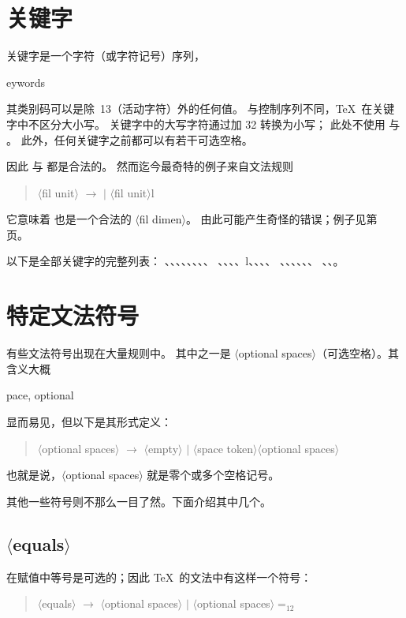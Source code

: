 \documentclass[a4paper]{rapport3}
\def\gr#1{$\langle$#1$\rangle$}\def\key#1{{\tt#1}}
\newenvironment{disp}{\begin{quotation}}{\end{quotation}}
\def\term#1\par{\index{#1}}
\begin{document}
\section{关键字}
\label{keywords}

关键字是一个字符（或字符记号）序列，
\term keywords\par
其类别码可以是除~13（活动字符）外的任何值。
与控制序列不同，\TeX\ 在关键字中不区分大小写。
关键字中的大写字符通过加 32 转换为小写；
此处不使用  与 。
此外，任何关键字之前都可以有若干可选空格。

因此  与  都是合法的。
然而迄今最奇特的例子来自文法规则
\begin{disp}\gr{fil unit} $\longrightarrow$  $|$ \gr{fil unit}\n l
\end{disp}
它意味着 \hbox{} 也是一个合法的 \gr{fil dimen}。
由此可能产生奇怪的错误；例子见第~\pageref{fil:l:l} 页。

以下是全部关键字的完整列表：
、、、、、、、、
、、、、\n l、、、、
、、、、、、
、、。

\section{特定文法符号}

有些文法符号出现在大量规则中。
其中之一是 \gr{optional spaces}（可选空格）。其含义大概\
\term space, optional\par
显而易见，但以下是其形式定义：
\begin{disp}\gr{optional spaces} $\longrightarrow$
     \gr{empty} $|$ \gr{space token}\gr{optional spaces}
     \end{disp}
也就是说，\gr{optional spaces} 就是零个或多个空格记号。

其他一些符号则不那么一目了然。下面介绍其中几个。

\subsection{\gr{equals}}

在赋值中等号是可选的；因此 \TeX\ 的文法中有这样一个符号：
\begin{disp}\gr{equals} $\longrightarrow$ \gr{optional spaces}
     $|$ \gr{optional spaces}$=_{12}$\end{disp}
\end{document}
